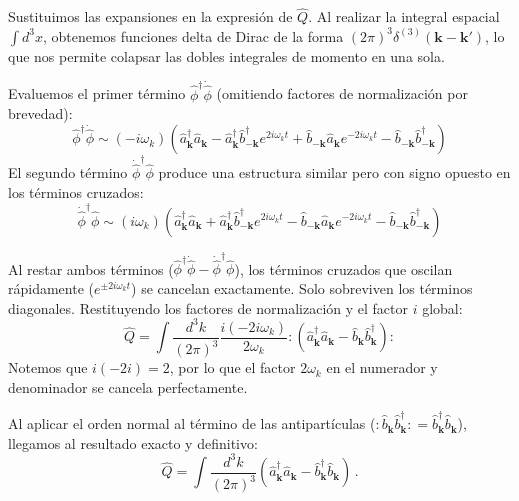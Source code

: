 Sustituimos las expansiones en la expresión de $\hat{Q}$. Al realizar la integral espacial $\int d^3x$, obtenemos funciones delta de Dirac de la forma $(2\pi)^3 \delta^{(3)}(\mathbf{k} - \mathbf{k}')$, lo que nos permite colapsar las dobles integrales de momento en una sola. 

Evaluemos el primer término $\hat{\phi}^\dagger \dot{\hat{\phi}}$ (omitiendo factores de normalización por brevedad):
\begin{equation}
    \hat{\phi}^\dagger \dot{\hat{\phi}} \sim (-i\omega_k) \left( \hat{a}_\mathbf{k}^\dagger \hat{a}_\mathbf{k} - \hat{a}_\mathbf{k}^\dagger \hat{b}_{-\mathbf{k}}^\dagger e^{2i\omega_k t} + \hat{b}_{-\mathbf{k}} \hat{a}_\mathbf{k} e^{-2i\omega_k t} - \hat{b}_{-\mathbf{k}}\hat{b}_{-\mathbf{k}}^\dagger \right)
\end{equation}
El segundo término $\dot{\hat{\phi}}^\dagger \hat{\phi}$ produce una estructura similar pero con signo opuesto en los términos cruzados:
\begin{equation}
    \dot{\hat{\phi}}^\dagger \hat{\phi} \sim (i\omega_k) \left( \hat{a}_\mathbf{k}^\dagger \hat{a}_\mathbf{k} + \hat{a}_\mathbf{k}^\dagger \hat{b}_{-\mathbf{k}}^\dagger e^{2i\omega_k t} - \hat{b}_{-\mathbf{k}} \hat{a}_\mathbf{k} e^{-2i\omega_k t} - \hat{b}_{-\mathbf{k}}\hat{b}_{-\mathbf{k}}^\dagger \right)
\end{equation}

Al restar ambos términos ($\hat{\phi}^\dagger \dot{\hat{\phi}} - \dot{\hat{\phi}}^\dagger \hat{\phi}$), los términos cruzados que oscilan rápidamente ($e^{\pm 2i\omega_k t}$) se cancelan exactamente. Solo sobreviven los términos diagonales. Restituyendo los factores de normalización y el factor $i$ global:
\begin{equation}
    \hat{Q} = \int \frac{d^3k}{(2\pi)^3} \frac{i (-2i\omega_k)}{2\omega_k} :\left( \hat{a}_\mathbf{k}^\dagger \hat{a}_\mathbf{k} - \hat{b}_\mathbf{k} \hat{b}_\mathbf{k}^\dagger \right):
\end{equation}
Notemos que $i(-2i) = 2$, por lo que el factor $2\omega_k$ en el numerador y denominador se cancela perfectamente.

Al aplicar el orden normal al término de las antipartículas ($:\hat{b}_\mathbf{k} \hat{b}_\mathbf{k}^\dagger: = \hat{b}_\mathbf{k}^\dagger \hat{b}_\mathbf{k}$), llegamos al resultado exacto y definitivo:
\begin{equation}
    \hat{Q} = \int \frac{d^3k}{(2\pi)^3} \left( \hat{a}_\mathbf{k}^\dagger \hat{a}_\mathbf{k} - \hat{b}_\mathbf{k}^\dagger \hat{b}_\mathbf{k} \right) \, .
    \label{eq:carga_operador_final}
\end{equation}

